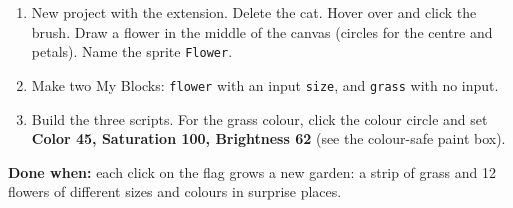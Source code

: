 \begin{exercise}
\begin{enumerate}[leftmargin=1.4em,itemsep=1pt]
  \item New project with the  extension. Delete the cat. Hover over  and click the  brush. Draw a flower in the middle of the canvas (circles for the centre and petals). Name the sprite \texttt{Flower}.
  \item Make two My Blocks: \texttt{flower} with an input \texttt{size}, and \texttt{grass} with no input.
  \item Build the three scripts. For the grass colour, click the colour circle and set \textbf{Color 45, Saturation 100, Brightness 62} (see the colour-safe paint box).
\end{enumerate}
\begin{center}
\begin{scratch}[scale=0.72]
\end{scratch}
\hspace{0.4cm}
\begin{scratch}[scale=0.72]
\end{scratch}

\medskip
\begin{scratch}[scale=0.72]
\end{scratch}
\end{center}
\textbf{Done when:} each click on the flag grows a new garden: a strip of grass and 12 flowers of different sizes and colours in surprise places.
\end{exercise}

